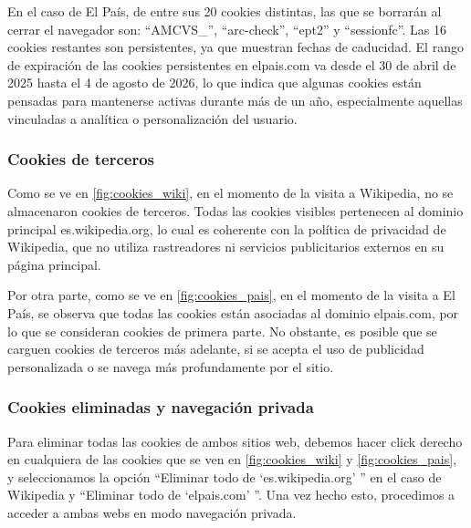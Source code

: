 En el caso de El País, de entre sus 20 cookies distintas, las que se borrarán al cerrar el navegador son: ``AMCVS\_'', ``arc-check'', ``ept2'' y ``sessionfc''. Las 16 cookies restantes son persistentes, ya que muestran fechas de caducidad. El rango de expiración de las cookies persistentes en elpais.com va desde el 30 de abril de 2025 hasta el 4 de agosto de 2026, lo que indica que algunas cookies están pensadas para mantenerse activas durante más de un año, especialmente aquellas vinculadas a analítica o personalización del usuario. 

\subsubsection{Cookies de terceros}

Como se ve en \ref{fig:cookies_wiki}, en el momento de la visita a Wikipedia, no se almacenaron cookies de terceros. Todas las cookies visibles pertenecen al dominio principal es.wikipedia.org, lo cual es coherente con la política de privacidad de Wikipedia, que no utiliza rastreadores ni servicios publicitarios externos en su página principal. 

Por otra parte, como se ve en \ref{fig:cookies_pais}, en el momento de la visita a El País, se observa que todas las cookies están asociadas al dominio elpais.com, por lo que se consideran cookies de primera parte. No obstante, es posible que se carguen cookies de terceros más adelante, si se acepta el uso de publicidad personalizada o se navega más profundamente por el sitio.

\subsubsection{Cookies eliminadas y navegación privada}

Para eliminar todas las cookies de ambos sitios web, debemos hacer click derecho en cualquiera de las cookies que se ven en \ref{fig:cookies_wiki} y \ref{fig:cookies_pais}, y seleccionamos la opción ``Eliminar todo de `es.wikipedia.org' '' en el caso de Wikipedia y ``Eliminar todo de `elpais.com' ''. Una vez hecho esto, procedimos a acceder a ambas webs en modo navegación privada. 

